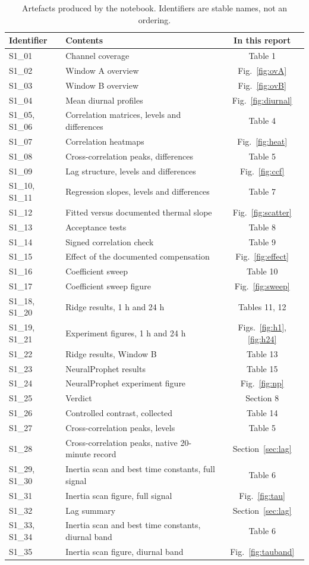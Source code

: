 \documentclass[11pt,a4paper]{article}
\begin{document}
\begin{table}[H]
\centering
\small
\caption{Artefacts produced by the notebook. Identifiers are stable names, not an
ordering.}
\begin{tabular}{@{}l L{9.2cm} c@{}}
\toprule
\textbf{Identifier} & \textbf{Contents} & \textbf{In this report}\\
\midrule
S1\_01 & Channel coverage & Table 1\\
S1\_02 & Window A overview & Fig.~\ref{fig:ovA}\\
S1\_03 & Window B overview & Fig.~\ref{fig:ovB}\\
S1\_04 & Mean diurnal profiles & Fig.~\ref{fig:diurnal}\\
S1\_05, S1\_06 & Correlation matrices, levels and differences & Table 4\\
S1\_07 & Correlation heatmaps & Fig.~\ref{fig:heat}\\
S1\_08 & Cross-correlation peaks, differences & Table 5\\
S1\_09 & Lag structure, levels and differences & Fig.~\ref{fig:ccf}\\
S1\_10, S1\_11 & Regression slopes, levels and differences & Table 7\\
S1\_12 & Fitted versus documented thermal slope & Fig.~\ref{fig:scatter}\\
S1\_13 & Acceptance tests & Table 8\\
S1\_14 & Signed correlation check & Table 9\\
S1\_15 & Effect of the documented compensation & Fig.~\ref{fig:effect}\\
S1\_16 & Coefficient sweep & Table 10\\
S1\_17 & Coefficient sweep figure & Fig.~\ref{fig:sweep}\\
S1\_18, S1\_20 & Ridge results, 1 h and 24 h & Tables 11, 12\\
S1\_19, S1\_21 & Experiment figures, 1 h and 24 h & Figs.~\ref{fig:h1}, \ref{fig:h24}\\
S1\_22 & Ridge results, Window B & Table 13\\
S1\_23 & NeuralProphet results & Table 15\\
S1\_24 & NeuralProphet experiment figure & Fig.~\ref{fig:np}\\
S1\_25 & Verdict & Section 8\\
S1\_26 & Controlled contrast, collected & Table 14\\
S1\_27 & Cross-correlation peaks, levels & Table 5\\
S1\_28 & Cross-correlation peaks, native 20-minute record & Section~\ref{sec:lag}\\
S1\_29, S1\_30 & Inertia scan and best time constants, full signal & Table 6\\
S1\_31 & Inertia scan figure, full signal & Fig.~\ref{fig:tau}\\
S1\_32 & Lag summary & Section~\ref{sec:lag}\\
S1\_33, S1\_34 & Inertia scan and best time constants, diurnal band & Table 6\\
S1\_35 & Inertia scan figure, diurnal band & Fig.~\ref{fig:tauband}\\
\bottomrule
\end{tabular}
\end{table}
\end{document}
